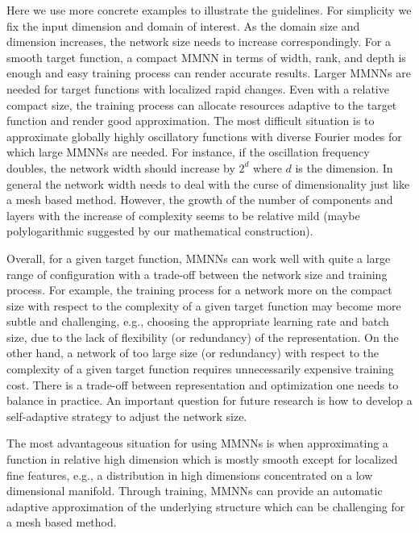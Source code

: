 \documentclass[review,hidelinks,onefignum,onetabnum]{siamart250211}
\begin{document}
    Here we use more concrete examples to illustrate the guidelines. For simplicity we fix the input dimension and domain of interest. As the domain size and dimension increases, the network size needs to increase correspondingly. For a smooth target function, a compact MMNN in terms of width, rank, and depth is enough and easy training process can render accurate results. Larger MMNNs are needed for target functions with localized rapid changes. Even with a relative compact size, the training process can allocate resources adaptive to the target function and render good approximation. The most difficult situation is to approximate globally highly oscillatory functions with diverse Fourier modes for which large MMNNs are needed. For instance, if the oscillation frequency doubles, the network width should increase by $2^d$ where $d$ is the dimension. In general the network width needs to deal with the curse of dimensionality just like a mesh based method. However, the growth of the number of components and layers with the increase of complexity seems to be relative mild (maybe polylogarithmic suggested by our mathematical construction).

    Overall, for a given target function, MMNNs can work well with quite a large range of configuration with a trade-off between the network size and training process. For example, the training process for a network more on the compact size with respect to the complexity of a given target function may become more subtle and challenging, e.g., choosing the appropriate learning rate and batch size, due to the lack of flexibility (or redundancy) of the representation. On the other hand, a network of too large size (or redundancy) with respect to the complexity of a given target function requires unnecessarily expensive training cost. There is a trade-off between representation and optimization one needs to balance in practice. An important question for future research is how to develop a self-adaptive strategy to adjust the network size.
    
    The most advantageous situation for using MMNNs is when approximating a function in relative high dimension which is mostly smooth except for localized fine features, e.g., a distribution in high dimensions concentrated on a low dimensional manifold. Through training, MMNNs can provide an automatic adaptive approximation of the underlying structure which can be challenging for a mesh based method. 
 
\end{document}
